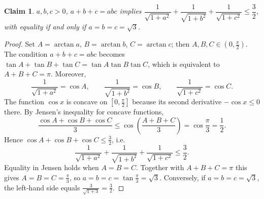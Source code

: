 \documentclass{article}
\newtheorem{claim}{Claim}
\begin{document}
\begin{claim}  %
$a,b,c>0$, $a+b+c=abc$ implies $\dfrac{1}{\sqrt{1+a^{2}}}+\dfrac{1}{\sqrt{1+b^{2}}}+\dfrac{1}{\sqrt{1+c^{2}}}\le\dfrac{3}{2}$, with equality if and only if $a=b=c=\sqrt{3}$.
\end{claim}
\begin{proof}
Set $A=\arctan a$, $B=\arctan b$, $C=\arctan c$; then $A,B,C\in(0,\frac{\pi}{2})$. The condition $a+b+c=abc$ becomes $\tan A+\tan B+\tan C=\tan A\tan B\tan C$, which is equivalent to $A+B+C=\pi$. Moreover,
\[
\frac{1}{\sqrt{1+a^{2}}}=\cos A,\qquad
\frac{1}{\sqrt{1+b^{2}}}=\cos B,\qquad
\frac{1}{\sqrt{1+c^{2}}}=\cos C.
\]
The function $\cos x$ is concave on $[0,\frac{\pi}{2}]$ because its second derivative $-\cos x\le0$ there. By Jensen's inequality for concave functions,
\[
\frac{\cos A+\cos B+\cos C}{3}\le\cos\!\left(\frac{A+B+C}{3}\right)=\cos\frac{\pi}{3}=\frac12.
\]
Hence $\cos A+\cos B+\cos C\le\frac32$, i.e.
\[
\frac{1}{\sqrt{1+a^{2}}}+\frac{1}{\sqrt{1+b^{2}}}+\frac{1}{\sqrt{1+c^{2}}}\le\frac{3}{2}.
\]
Equality in Jensen holds when $A=B=C$. Together with $A+B+C=\pi$ this gives $A=B=C=\frac{\pi}{3}$, so $a=b=c=\tan\frac{\pi}{3}=\sqrt{3}$. Conversely, if $a=b=c=\sqrt{3}$, the left‑hand side equals $\frac{3}{\sqrt{1+3}}=\frac{3}{2}$.
\end{proof}
\end{document}
